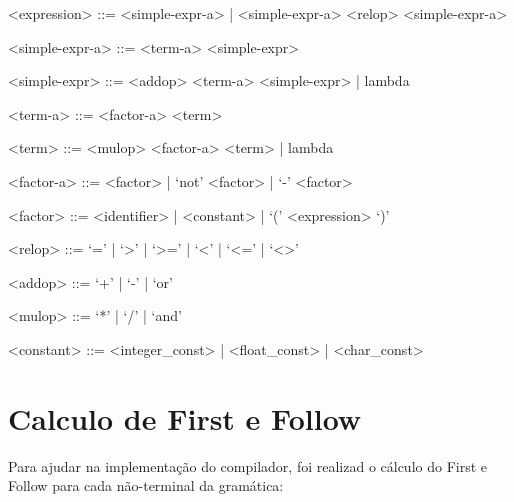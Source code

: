 \begin{grammar}
    <expression> ::= <simple-expr-a> | <simple-expr-a> <relop> <simple-expr-a>
    
    <simple-expr-a> ::= <term-a> <simple-expr>

    <simple-expr> ::= <addop> <term-a> <simple-expr> | lambda
    
    <term-a> ::= <factor-a> <term>

    <term> ::= <mulop> <factor-a> <term> | lambda
    
    <factor-a> ::= <factor> | `not' <factor> | `-' <factor>
    
    <factor> ::= <identifier> | <constant> | `(' <expression> `)'
    
    <relop> ::= `=' | `>' | `>=' | `<' | `<=' | `<>'
    
    <addop> ::= `+' | `-' | `or'
    
    <mulop> ::= `*' | `/' | `and'
    
    <constant> ::= <integer_const> | <float_const> | <char_const>
    
    \end{grammar}

\section{Calculo de First e Follow}

Para ajudar na implementação do compilador, foi realizad o cálculo do First e Follow para cada não-terminal da gramática:

